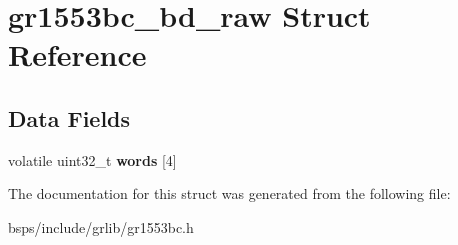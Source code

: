 \hypertarget{structgr1553bc__bd__raw}{}\section{gr1553bc\+\_\+bd\+\_\+raw Struct Reference}
\label{structgr1553bc__bd__raw}
\subsection*{Data Fields}
\begin{DoxyCompactItemize}
\item 
\mbox{\label{structgr1553bc__bd__raw_a99c072ca807cdc6a56f891276e7d3801}} 
volatile uint32\+\_\+t {\bfseries words} \mbox{[}4\mbox{]}
\end{DoxyCompactItemize}


The documentation for this struct was generated from the following file\+:\begin{DoxyCompactItemize}
\item 
bsps/include/grlib/gr1553bc.\+h\end{DoxyCompactItemize}
